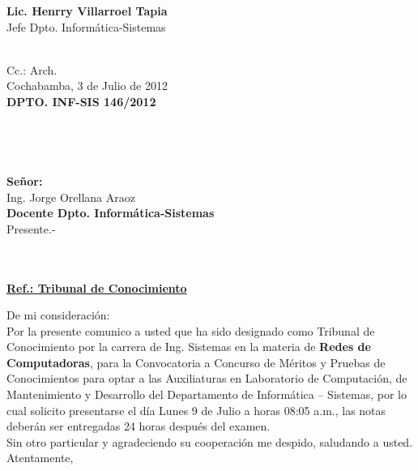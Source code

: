 \documentclass[letterpaper,11pt]{letter}
\begin{document}
\vspace{3.5cm}
\begin{center}
\begin{minipage}[b]{0.5\textwidth}
\begin{center}
{\bf Lic. Henrry Villarroel Tapia}\\
Jefe Dpto. Informática-Sistemas\\
\end{center}
\end{minipage}
\end{center}
~\\
Cc.: Arch.\\
\newpage
Cochabamba, 3 de Julio de 2012~\\
 \textbf{DPTO. INF-SIS 146/2012}\\
~\\
~\\
~\\
~\\
 \textbf{Señor:}~\\
Ing. Jorge Orellana Araoz~\\
 \textbf{Docente Dpto. Informática-Sistemas}~\\
Presente.-\\
~\\
~\\
\begin{center}
\underline{ \textbf{Ref.: Tribunal de Conocimiento}}
\end{center}
De mi consideración:\\
Por la presente comunico a usted que ha sido designado como Tribunal de Conocimiento por la carrera de Ing. Sistemas en la materia de \textbf{Redes de Computadoras}, para la Convocatoria a Concurso de Méritos y Pruebas de Conocimientos para optar a las Auxiliaturas en Laboratorio de Computación, de Mantenimiento y Desarrollo del Departamento de Informática – Sistemas, por lo cual solicito presentarse el día Lunes 9 de Julio a horas 08:05 a.m., las notas deberán ser entregadas 24 horas después del examen.\\
Sin otro particular y agradeciendo su cooperación me despido, saludando a usted.\\
Atentamente,\\
\end{document}
